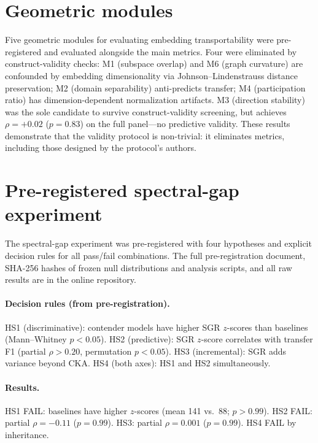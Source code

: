 \documentclass[11pt]{article}
\begin{document}
\section{Geometric modules}
\label{app:modules}

Five geometric modules for evaluating embedding transportability were
pre-registered and evaluated alongside the main metrics. Four were
eliminated by construct-validity checks: M1 (subspace overlap) and M6
(graph curvature) are confounded by embedding dimensionality via
Johnson--Lindenstrauss distance preservation; M2 (domain separability)
anti-predicts transfer; M4 (participation ratio) has
dimension-dependent normalization artifacts. M3 (direction stability)
was the sole candidate to survive construct-validity screening, but
achieves $\rho = +0.02$ ($p = 0.83$) on the full panel---no
predictive validity. These results demonstrate that the validity
protocol is non-trivial: it eliminates metrics, including those designed
by the protocol's authors.


\section{Pre-registered spectral-gap experiment}
\label{app:spectral}

The spectral-gap experiment was pre-registered with four hypotheses and
explicit decision rules for all pass/fail combinations. The full
pre-registration document, SHA-256 hashes of frozen null distributions
and analysis scripts, and all raw results are in the online repository.

\paragraph{Decision rules (from pre-registration).} HS1 (discriminative):
contender models have higher SGR $z$-scores than baselines (Mann--Whitney
$p < 0.05$). HS2 (predictive): SGR $z$-score correlates with transfer
F1 (partial $\rho > 0.20$, permutation $p < 0.05$). HS3 (incremental):
SGR adds variance beyond CKA. HS4 (both axes): HS1 and HS2
simultaneously.

\paragraph{Results.} HS1 FAIL: baselines have higher $z$-scores
(mean 141 vs.\ 88; $p > 0.99$). HS2 FAIL: partial $\rho = -0.11$
($p = 0.99$). HS3: partial $\rho = 0.001$ ($p = 0.99$). HS4 FAIL by
inheritance.
\end{document}
